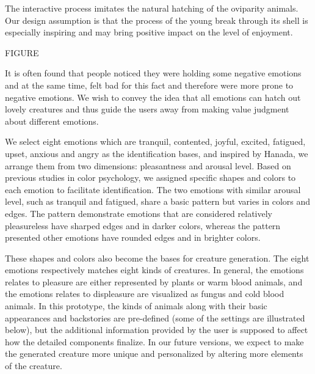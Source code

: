 \documentclass[manuscript,screen]{acmart}
\begin{document}
The interactive process imitates the natural hatching of the oviparity animals. Our design assumption is that the process of the young break through its shell is especially inspiring and may bring positive impact on the level of enjoyment.\cite{nezlek2008regulating}

FIGURE

It is often found that people noticed they were holding some negative emotions and at the same time, felt bad for this fact and therefore were more prone to negative emotions. We wish to convey the idea that all emotions can hatch out lovely creatures and thus guide the users away from making value judgment about different emotions.

We select eight emotions which are tranquil, contented, joyful, excited, fatigued, upset, anxious and angry as the identification bases, and inspired by Hanada,\cite{hanada2018correspondence}
we arrange them from two dimensions: pleasantness and arousal level. Based on previous studies in color psychology,\cite{valdez1994effects}
we assigned specific shapes and colors to each emotion to facilitate identification. The two emotions with similar arousal level, such as tranquil and fatigued, share a basic pattern but varies in colors and edges. The pattern demonstrate emotions that are considered relatively pleasureless have sharped edges and in darker colors, whereas the pattern presented other emotions have rounded edges and in brighter colors. 

These shapes and colors also become the bases for creature generation. The eight emotions respectively matches eight kinds of creatures. In general, the emotions relates to pleasure are either represented by plants or warm blood animals, and the emotions relates to displeasure are visualized as fungus and cold blood animals. In this prototype, the kinds of animals along with their basic appearances and backstories are pre-defined (some of the settings are illustrated below), but the additional information provided by the user is supposed to affect how the detailed components finalize. In our future versions, we expect to make the generated creature more unique and personalized by altering more elements of the creature.
\end{document}
